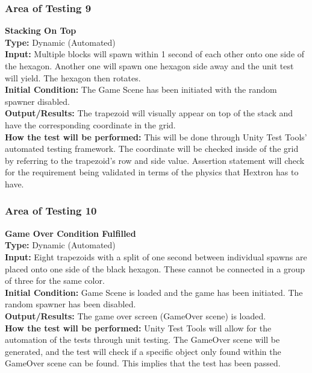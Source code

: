 \documentclass[12pt, titlepage]{article}
\begin{document}
{\subsubsection{Area of Testing 9}
\noindent \textbf{Stacking On Top}\\
\textbf{Type:} Dynamic (Automated)\\
\textbf{Input:} Multiple blocks will spawn within 1 second  of each other onto one side of the hexagon. Another one will spawn one hexagon side away and the unit test will yield. The hexagon then rotates.\\
\textbf{Initial Condition:} The Game Scene has been initiated with the random spawner disabled.\\
\textbf{Output/Results:} The trapezoid will visually appear on top of the stack and have the corresponding coordinate in the grid.\\
\textbf{How the test will be performed:} This will be done through Unity Test Tools' automated testing framework. The coordinate will be checked inside of the grid by referring to the trapezoid's row and side value. Assertion statement will check for the requirement being validated in terms of the physics that Hextron has to have.\\

\subsubsection{Area of Testing 10}
\noindent \textbf{Game Over Condition Fulfilled}\\
\textbf{Type:} Dynamic (Automated)\\
\textbf{Input:} Eight trapezoids with a split of one second between individual spawns are placed onto one side of the black hexagon. These cannot be connected in a group of three for the same color.\\
\textbf{Initial Condition:} Game Scene is loaded  and the game has been initiated. The random spawner has been disabled.\\
\textbf{Output/Results:} The game over screen (GameOver scene) is loaded.\\
\textbf{How the test will be performed:} Unity Test Tools will allow for the automation of the tests through unit testing. The GameOver scene will be generated, and the test will check if a specific object only found within the GameOver scene can be found. This implies that the test has been passed. \\


}
\end{document}
